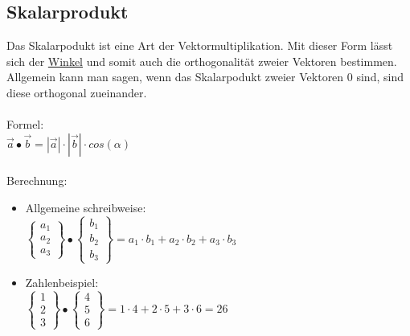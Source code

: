 \subsection{Skalarprodukt}
\label{sec:skalarprodukt}
Das Skalarpodukt ist eine Art der Vektormultiplikation.
Mit dieser Form lässt sich der 
\hyperref[sec:winkel_vektoren]{Winkel}
und somit auch die orthogonalität zweier Vektoren bestimmen. 
Allgemein kann man sagen, wenn das Skalarpodukt zweier Vektoren $0$ sind, sind diese orthogonal zueinander.
\\\\
Formel: \\
$
\vec{a} \bullet \vec{b} = |\vec{a}| \cdot |\vec{b}| \cdot cos(\alpha)
$
\\\\
Berechnung:
\begin{itemize}

    \item Allgemeine schreibweise: \\
    $
    \begin{Bmatrix}
        a_1 \\ a_2 \\ a_3
    \end{Bmatrix}
    \bullet 
    \begin{Bmatrix}
        b_1 \\ b_2 \\ b_3
    \end{Bmatrix}
    =
    a_1 \cdot b_1 + a_2 \cdot b_2 + a_3 \cdot b_3
    $
    \item Zahlenbeispiel: \\
    $
    \begin{Bmatrix}
        1 \\ 2 \\ 3
    \end{Bmatrix}
    \bullet
    \begin{Bmatrix}
    4 \\ 5 \\ 6
    \end{Bmatrix}
    = 
    1 \cdot 4 + 2 \cdot 5 + 3 \cdot 6 = 26
    $
\end{itemize}

